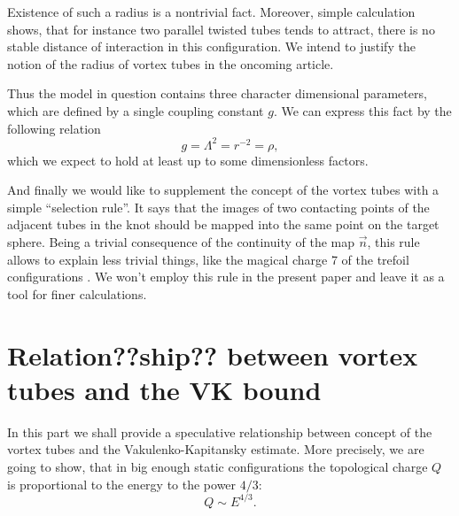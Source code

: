 \documentclass[a4paper,12pt]{article}
\begin{document}
        Existence of such a radius is a nontrivial fact.
        Moreover, simple calculation shows, that for instance two parallel
        twisted tubes tends to attract, there is no stable distance of
        interaction in this configuration.
        We intend to justify the notion of the radius of vortex tubes
        in the oncoming article.

        Thus the model in question contains three character
        dimensional parameters, which are defined by a single coupling
        constant 
    $ g $.
        We can express this fact by the following relation
\begin{equation}
    g = \Lambda^{2} = r^{-2} = \rho ,
\end{equation}
        which we expect to hold at least up to some dimensionless factors.

        And finally we would like to supplement the concept of the vortex
        tubes with a simple ``selection rule''. It says that the images of
        two contacting points of the adjacent tubes in the knot should be
        mapped into the same point on the target sphere.
        Being a trivial consequence of the continuity of the map 
    $ \vec{n} $,
        this rule allows to explain less trivial things, like the magical
        charge 7 of the trefoil configurations
\cite{}.
	We won't employ this rule in the present paper and leave it as a tool
	for finer calculations.

\section{Relation??ship?? between vortex tubes and the VK bound}
        In this part we shall provide a speculative relationship
        between concept of the vortex tubes and the Vakulenko-Kapitansky
        estimate. 
        More precisely, we are going to show, that in big
        enough static configurations the topological charge 
    $ Q $
        is proportional to the energy to the power 
    $ 4/3 $:
\begin{equation}
\label{QE}
    Q \sim E^{4/3} .
\end{equation}
\end{document}
